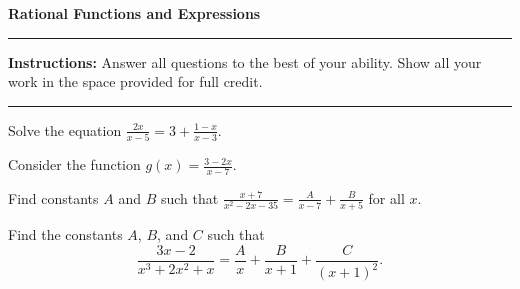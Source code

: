 \documentclass[12pt]{exam}
\newcommand{\examtitle}{Rational Functions and Expressions}
\newcommand{\instructions}{
    \noindent\rule{\textwidth}{0.5pt}
    \begin{center}
    \textbf{Instructions:} Answer all questions to the best of your ability. Show all your work in the space provided for full credit.
    \end{center}
    \noindent\rule{\textwidth}{0.5pt}
}
\begin{document}
\begin{center}
\textbf{\Large \examtitle} \\
\vspace{0.5cm}
\hspace{0.1\textwidth}
\end{center}

\instructions
\vspace{0.5cm}

\begin{questions}

\pointsinrightmargin

\question[8]
Solve the equation $\frac{2x}{x-5} = 3 + \frac{1-x}{x-3}$.
\vspace*{5cm}

\question[12]
Consider the function $g(x) = \frac{3-2x}{x-7}$.

\newpage

\question[10]
Find constants $A$ and $B$ such that $\frac{x+7}{x^2-2x-35} = \frac{A}{x-7} + \frac{B}{x+5}$ for all $x$.
\vspace*{5cm}

\question[12]
Find the constants $A$, $B$, and $C$ such that 
$$\frac{3x-2}{x^3+2x^2+x} = \frac{A}{x} + \frac{B}{x+1} + \frac{C}{(x+1)^2}.$$
\vspace*{6cm}


\end{questions}
\end{document}
